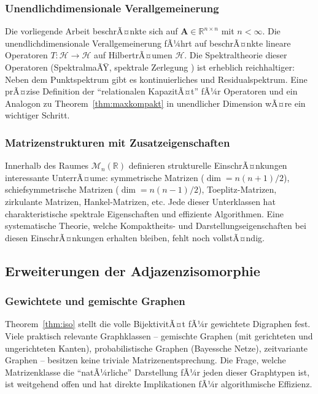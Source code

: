 ﻿\documentclass[12pt, a4paper]{article}
\theoremstyle{definition}
\theoremstyle{remark}
\newcommand{\R}{\mathbb{R}}
\newcommand{\vA}{\bm{A}}
\begin{document}
\subsubsection*{Unendlichdimensionale Verallgemeinerung}

Die vorliegende Arbeit beschrÃ¤nkte sich auf $\vA \in \R^{n \times n}$
mit $n < \infty$. Die unendlichdimensionale Verallgemeinerung fÃ¼hrt
auf beschrÃ¤nkte lineare Operatoren $T: \mathcal{H} \to \mathcal{H}$ auf
HilbertrÃ¤umen $\mathcal{H}$. Die Spektraltheorie dieser Operatoren
(SpektralmaÃŸ, spektrale Zerlegung \citep{riesz1955}) ist erheblich
reichhaltiger: Neben dem Punktspektrum gibt es kontinuierliches und
Residualspektrum. Eine prÃ¤zise Definition der ``relationalen KapazitÃ¤t''
fÃ¼r Operatoren und ein Analogon zu Theorem~\ref{thm:maxkompakt} in
unendlicher Dimension wÃ¤re ein wichtiger Schritt.

\subsubsection*{Matrizenstrukturen mit Zusatzeigenschaften}

Innerhalb des Raumes $\mathcal{M}_n(\R)$ definieren strukturelle
EinschrÃ¤nkungen interessante UnterrÃ¤ume: symmetrische Matrizen
($\dim = n(n+1)/2$), schiefsymmetrische Matrizen ($\dim = n(n-1)/2$),
Toeplitz-Matrizen, zirkulante Matrizen, Hankel-Matrizen, etc.
Jede dieser Unterklassen hat charakteristische spektrale Eigenschaften
und effiziente Algorithmen. Eine systematische Theorie, welche
Kompaktheits- und Darstellungseigenschaften bei diesen EinschrÃ¤nkungen
erhalten bleiben, fehlt noch vollstÃ¤ndig.

\subsection{Erweiterungen der Adjazenzisomorphie}
\label{subsec:adj_ausblick}

\subsubsection*{Gewichtete und gemischte Graphen}

Theorem~\ref{thm:iso} stellt die volle BijektivitÃ¤t fÃ¼r gewichtete
Digraphen fest. Viele praktisch relevante Graphklassen -- gemischte
Graphen (mit gerichteten und ungerichteten Kanten), probabilistische
Graphen (Bayessche Netze), zeitvariante Graphen -- besitzen keine
triviale Matrizenentsprechung. Die Frage, welche Matrizenklasse die
``natÃ¼rliche'' Darstellung fÃ¼r jeden dieser Graphtypen ist, ist
weitgehend offen und hat direkte Implikationen fÃ¼r algorithmische
Effizienz.
\end{document}
